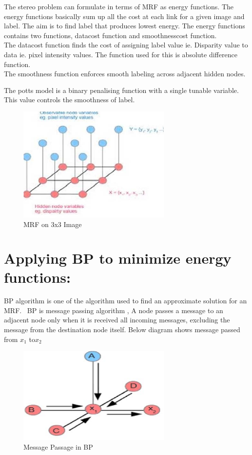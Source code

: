 The  stereo problem can formulate in terms of MRF as energy functions. The energy functions basically sum up all the cost at each link for a given image and label. The aim is to find label that produces lowest energy. The energy functions contains two functions, datacost function and smoothnesscost function.
\\The datacost function finds the cost of assigning label value ie. Disparity value to data ie. pixel intensity values. The function used for this is absolute difference function.
\\The smoothness function enforces smooth labeling across adjacent hidden nodes.

The  potts  model is a binary penalising function with a single tunable  variable. This value controls the smoothness of label.

\pagebreak
\begin{figure}[h]
\begin{center}
\includegraphics[width=3in]{mrf.eps}
\caption{MRF on 3x3 Image \cite{r11}} \label{mrf}
\end{center}
\end{figure}



\section{ Applying  BP to minimize energy functions:}

BP algorithm is one of the algorithm  used to find an approximate solution for an MRF.
\ BP is message passing algorithm , A node passes a message to an adjacent node only when it is received all incoming messages, excluding the message from the destination node itself.
Below diagram shows message passed from $x_{1}$ to$ x_{2}$

\pagebreak
\begin{figure}[h]
\begin{center}
\includegraphics[width=3in]{bp.eps}
\caption{Message Passage in BP  \cite{r11}} \label{bp}
\end{center}
\end{figure}



